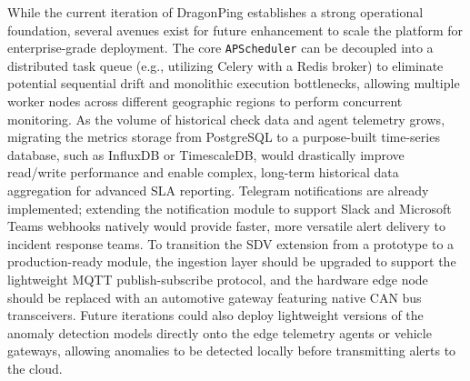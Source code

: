 \documentclass[12pt,a4paper,oneside]{report}
\begin{document}
\noindent While the current iteration of DragonPing establishes a strong operational foundation, several avenues exist for future enhancement to scale the platform for enterprise-grade deployment. The core \texttt{APScheduler} can be decoupled into a distributed task queue (e.g., utilizing Celery with a Redis broker) to eliminate potential sequential drift and monolithic execution bottlenecks, allowing multiple worker nodes across different geographic regions to perform concurrent monitoring. As the volume of historical check data and agent telemetry grows, migrating the metrics storage from PostgreSQL to a purpose-built time-series database, such as InfluxDB or TimescaleDB, would drastically improve read/write performance and enable complex, long-term historical data aggregation for advanced SLA reporting. Telegram notifications are already implemented; extending the notification module to support Slack and Microsoft Teams webhooks natively would provide faster, more versatile alert delivery to incident response teams. To transition the SDV extension from a prototype to a production-ready module, the ingestion layer should be upgraded to support the lightweight MQTT publish-subscribe protocol, and the hardware edge node should be replaced with an automotive gateway featuring native CAN bus transceivers. Future iterations could also deploy lightweight versions of the anomaly detection models directly onto the edge telemetry agents or vehicle gateways, allowing anomalies to be detected locally before transmitting alerts to the cloud.
\newpage
{}
\renewcommand{\bibname}{BIBLIOGRAPHY}
\end{document}
